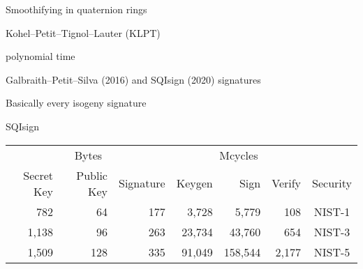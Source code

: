 \documentclass[aspectratio=169]{beamer}
\begin{document}

\begin{frame}{Smoothifying in quaternion rings}
  \large
  \begin{description}
    \setlength{\itemsep}{1em}
  \item[Algorithm:] Kohel--Petit--Tignol--Lauter (KLPT)
  \item[Cost:] polynomial time
  \item[Used in:] Galbraith--Petit--Silva (2016) and SQIsign (2020)
    signatures
  \end{description}
\end{frame}


\begin{frame}{Basically every isogeny signature}
  \large
  \centering
\end{frame}


\begin{frame}{SQIsign}
  \begin{table}[h]
    \centering
    \begin{tabular}{ r r r | r r r | c }
      \multicolumn{3}{c|}{Bytes} & \multicolumn{3}{c|}{Mcycles}\\
      Secret Key & Public Key & Signature & Keygen & Sign & Verify & Security \\
      \hline
      782 & 64 & 177 & 3,728 & 5,779 & 108 & NIST-1 \\
      1,138 & 96 & 263 & 23,734 & 43,760 & 654 & NIST-3 \\
      1,509 & 128 & 335 & 91,049 & 158,544 & 2,177 & NIST-5 \\
    \end{tabular}
  \end{table}
\end{frame}
\end{document}
